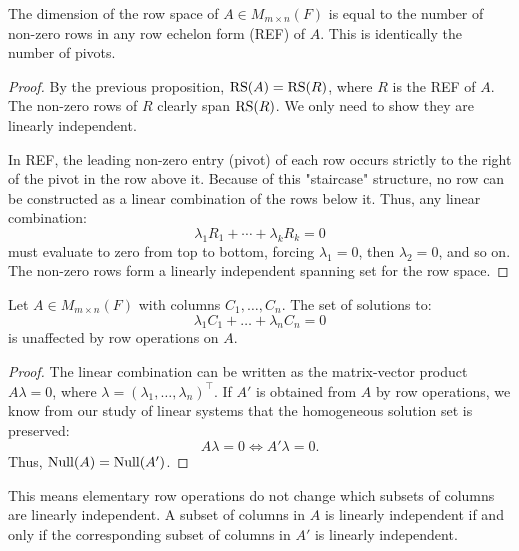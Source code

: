 \documentclass[../linear_algebra_and_groups.tex]{subfiles}
\begin{document}
\begin{corollary}
    \begin{shaded*}
        The dimension of the row space of $A\in M_{m\times n}(F)$ is equal to the number of non-zero rows in any row echelon form (REF) of $A$. This is identically the number of pivots.
    \end{shaded*}
\end{corollary}
\begin{proof}
    By the previous proposition, $\operatorname{RS}(A) = \operatorname{RS}(R)$, where $R$ is the REF of $A$. The non-zero rows of $R$ clearly span $\operatorname{RS}(R)$. We only need to show they are linearly independent. 
    
    In REF, the leading non-zero entry (pivot) of each row occurs strictly to the right of the pivot in the row above it. Because of this "staircase" structure, no row can be constructed as a linear combination of the rows below it. Thus, any linear combination:
    \[ \lambda_1 R_1 + \cdots + \lambda_k R_k = 0 \]
    must evaluate to zero from top to bottom, forcing $\lambda_1 = 0$, then $\lambda_2 = 0$, and so on. The non-zero rows form a linearly independent spanning set for the row space. 
    \qedhere
\end{proof}

\begin{proposition}
    \begin{shaded*}
        Let $A\in M_{m\times n}(F)$ with columns $C_1,\dots,C_n$. The set of solutions to:
        \[ \lambda_1C_1+\dots+\lambda_nC_n=0 \]
        is unaffected by row operations on $A$.
    \end{shaded*}
\end{proposition}
\begin{proof}
    The linear combination can be written as the matrix-vector product $A\lambda = 0$, where $\lambda = (\lambda_1, \dots, \lambda_n)^\top$. 
    If $A'$ is obtained from $A$ by row operations, we know from our study of linear systems that the homogeneous solution set is preserved:
    \[ A\lambda = 0 \iff A'\lambda = 0. \]
    Thus, $\operatorname{Null}(A) = \operatorname{Null}(A')$.
    \qedhere
\end{proof}

\begin{remark}
    This means elementary row operations do not change which subsets of columns are linearly independent. A subset of columns in $A$ is linearly independent if and only if the corresponding subset of columns in $A'$ is linearly independent.
\end{remark}
\end{document}
